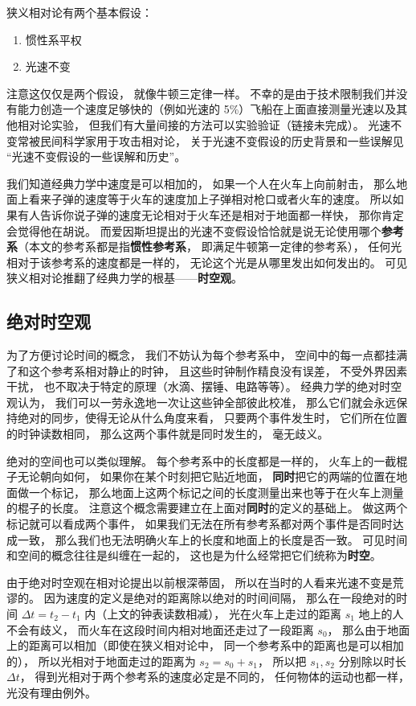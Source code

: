 

狭义相对论有两个基本假设：
\begin{enumerate}
\item 惯性系平权
\item 光速不变
\end{enumerate}
注意这仅仅是两个假设， 就像牛顿三定律一样。 不幸的是由于技术限制我们并没有能力创造一个速度足够快的（例如光速的 5\%）飞船在上面直接测量光速以及其他相对论实验， 但我们有大量间接的方法可以实验验证（链接未完成）。 光速不变常被民间科学家用于攻击相对论， 关于光速不变假设的历史背景和一些误解见 “光速不变假设的一些误解和历史”。

我们知道经典力学中速度是可以相加的， 如果一个人在火车上向前射击， 那么地面上看来子弹的速度等于火车的速度加上子弹相对枪口或者火车的速度。 所以如果有人告诉你说子弹的速度无论相对于火车还是相对于地面都一样快， 那你肯定会觉得他在胡说。 而爱因斯坦提出的光速不变假设恰恰就是说无论使用哪个\textbf{参考系}（本文的参考系都是指\textbf{惯性参考系}， 即满足牛顿第一定律的参考系）， 任何光相对于该参考系的速度都是一样的， 无论这个光是从哪里发出如何发出的。 可见狭义相对论推翻了经典力学的根基——\textbf{时空观}。

\subsection{绝对时空观} \label{sub_Relat0_1}
为了方便讨论时间的概念， 我们不妨认为每个参考系中， 空间中的每一点都挂满了和这个参考系相对静止的时钟， 且这些时钟制作精良没有误差， 不受外界因素干扰， 也不取决于特定的原理（水滴、摆锤、电路等等）。 经典力学的绝对时空观认为， 我们可以一劳永逸地一次让这些钟全部彼此校准， 那么它们就会永远保持绝对的同步，使得无论从什么角度来看， 只要两个事件发生时， 它们所在位置的时钟读数相同， 那么这两个事件就是同时发生的， 毫无歧义。

绝对的空间也可以类似理解。 每个参考系中的长度都是一样的， 火车上的一截棍子无论朝向如何， 如果你在某个时刻把它贴近地面， \textbf{同时}把它的两端的位置在地面做一个标记， 那么地面上这两个标记之间的长度测量出来也等于在火车上测量的棍子的长度。 注意这个概念需要建立在上面对\textbf{同时}的定义的基础上。 做这两个标记就可以看成两个事件， 如果我们无法在所有参考系都对两个事件是否同时达成一致， 那么我们也无法明确火车上的长度和地面上的长度是否一致。 可见时间和空间的概念往往是纠缠在一起的， 这也是为什么经常把它们统称为\textbf{时空}。

由于绝对时空观在相对论提出以前根深蒂固， 所以在当时的人看来光速不变是荒谬的。 因为速度的定义是绝对的距离除以绝对的时间间隔， 那么在一段绝对的时间 $\Delta t = t_2 - t_1$ 内（上文的钟表读数相减）， 光在火车上走过的距离 $s_1$ 地上的人不会有歧义， 而火车在这段时间内相对地面还走过了一段距离 $s_0$， 那么由于地面上的距离可以相加（即使在狭义相对论中， 同一个参考系中的距离也是可以相加的）， 所以光相对于地面走过的距离为 $s_2 = s_0 + s_1$， 所以把 $s_1, s_2$ 分别除以时长 $\Delta t$， 得到光相对于两个参考系的速度必定是不同的， 任何物体的运动也都一样， 光没有理由例外。

